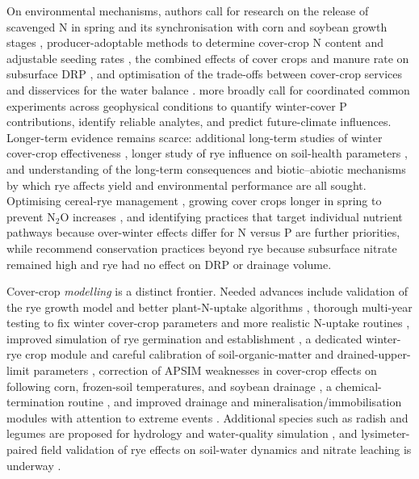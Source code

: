 On environmental mechanisms, authors call for research on the release of scavenged N in spring and its synchronisation with corn and soybean growth stages \parencite{Lacey2015}, producer-adoptable methods to determine cover-crop N content and adjustable seeding rates \parencite{Roth2018}, the combined effects of cover crops and manure rate on subsurface DRP \parencite{Askar2023}, and optimisation of the trade-offs between cover-crop services and disservices for the water balance \parencite{Meyer2019}. \textcite{Liu2019} more broadly call for coordinated common experiments across geophysical conditions to quantify winter-cover P contributions, identify reliable analytes, and predict future-climate influences. Longer-term evidence remains scarce: additional long-term studies of winter cover-crop effectiveness \parencite{Kaspar2012}, longer study of rye influence on soil-health parameters \parencite{Bawa2023}, and understanding of the long-term consequences and biotic--abiotic mechanisms by which rye affects yield and environmental performance \parencite{MartinezFeria2016} are all sought. Optimising cereal-rye management \parencite{deOliveira2022}, growing cover crops longer in spring to prevent N$_2$O increases \parencite{PrezaFontes2023}, and identifying practices that target individual nutrient pathways because over-winter effects differ for N versus P \parencite{McNeill2026} are further priorities, while \textcite{Krueger2013} recommend conservation practices beyond rye because subsurface nitrate remained high and rye had no effect on DRP or drainage volume.

Cover-crop \emph{modelling} is a distinct frontier. Needed advances include validation of the rye growth model and better plant-N-uptake algorithms \parencite{Feyereisen2006}, thorough multi-year testing to fix winter cover-crop parameters and more realistic N-uptake routines \parencite{Malone2007c}, improved simulation of rye germination and establishment \parencite{Malone2014b}, a dedicated winter-rye crop module and careful calibration of soil-organic-matter and drained-upper-limit parameters \parencite{Chatterjee2025}, correction of APSIM weaknesses in cover-crop effects on following corn, frozen-soil temperatures, and soybean drainage \parencite{Dietzel2016}, a chemical-termination routine \parencite{Gupta2022}, and improved drainage and mineralisation/immobilisation modules with attention to extreme events \parencite{Gupta2023b}. Additional species such as radish and legumes are proposed for hydrology and water-quality simulation \parencite{Singh2023}, and lysimeter-paired field validation of rye effects on soil-water dynamics and nitrate leaching is underway \parencite{Qi2010b}.

